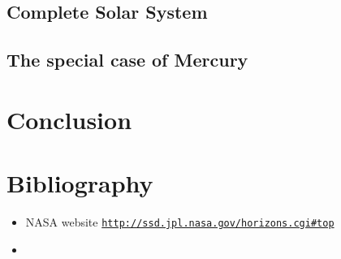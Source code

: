 \documentclass[a4paper, twoside, 11pt]{report}
\theoremstyle{theorem}
\theoremstyle{remark}
\theoremstyle{exemple}
\begin{document}
            
    \section{Complete Solar System}
        \subsection{}
        
        \subsection{}
        
    
    \section{The special case of Mercury}
        \section{}
            \paragraph{}
    
    

\chapter*{Conclusion}

    \paragraph{}
    
    
    
    
\chapter*{Bibliography}
    \begin{itemize}
        \item NASA website \href{{http://ssd.jpl.nasa.gov/horizons.cgi#top}}{\nolinkurl{http://ssd.jpl.nasa.gov/horizons.cgi\#top}}
        \item 
    \end{itemize}
    
    
    
    
    
    
    
    
    
    
\end{document}
